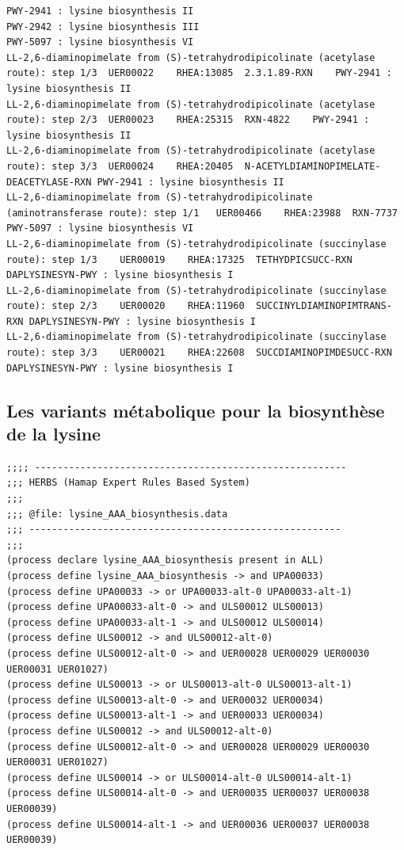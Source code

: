 \begin{adjustbox}{width=\textwidth}
\begin{lstlisting}[basicstyle=\tiny\normalfont\ttfamily,tabsize=2,showtabs=true,caption=DAP\_uer\_metacyc.tsv]
PWY-2941 : lysine biosynthesis II 
PWY-2942 : lysine biosynthesis III 
PWY-5097 : lysine biosynthesis VI 
LL-2,6-diaminopimelate from (S)-tetrahydrodipicolinate (acetylase route): step 1/3	UER00022	RHEA:13085	2.3.1.89-RXN	PWY-2941 : lysine biosynthesis II 
LL-2,6-diaminopimelate from (S)-tetrahydrodipicolinate (acetylase route): step 2/3	UER00023	RHEA:25315	RXN-4822	PWY-2941 : lysine biosynthesis II 
LL-2,6-diaminopimelate from (S)-tetrahydrodipicolinate (acetylase route): step 3/3	UER00024	RHEA:20405	N-ACETYLDIAMINOPIMELATE-DEACETYLASE-RXN	PWY-2941 : lysine biosynthesis II 
LL-2,6-diaminopimelate from (S)-tetrahydrodipicolinate (aminotransferase route): step 1/1	UER00466	RHEA:23988	RXN-7737	PWY-5097 : lysine biosynthesis VI 
LL-2,6-diaminopimelate from (S)-tetrahydrodipicolinate (succinylase route): step 1/3	UER00019	RHEA:17325	TETHYDPICSUCC-RXN	DAPLYSINESYN-PWY : lysine biosynthesis I 
LL-2,6-diaminopimelate from (S)-tetrahydrodipicolinate (succinylase route): step 2/3	UER00020	RHEA:11960	SUCCINYLDIAMINOPIMTRANS-RXN	DAPLYSINESYN-PWY : lysine biosynthesis I 
LL-2,6-diaminopimelate from (S)-tetrahydrodipicolinate (succinylase route): step 3/3	UER00021	RHEA:22608	SUCCDIAMINOPIMDESUCC-RXN	DAPLYSINESYN-PWY : lysine biosynthesis I 
\end{lstlisting}
\end{adjustbox}

\subsection{Les variants métabolique pour la biosynthèse de la lysine}
\begin{lstlisting}[basicstyle=\tiny\normalfont\ttfamily,caption=data/processes/lysine\_DAP\_biosynthesis.data]
;;;; -------------------------------------------------------
;;; HERBS (Hamap Expert Rules Based System)
;;;
;;; @file: lysine_AAA_biosynthesis.data
;;; -------------------------------------------------------
;;;
(process declare lysine_AAA_biosynthesis present in ALL)
(process define lysine_AAA_biosynthesis -> and UPA00033)
(process define UPA00033 -> or UPA00033-alt-0 UPA00033-alt-1)
(process define UPA00033-alt-0 -> and ULS00012 ULS00013)
(process define UPA00033-alt-1 -> and ULS00012 ULS00014)
(process define ULS00012 -> and ULS00012-alt-0)
(process define ULS00012-alt-0 -> and UER00028 UER00029 UER00030 UER00031 UER01027)
(process define ULS00013 -> or ULS00013-alt-0 ULS00013-alt-1)
(process define ULS00013-alt-0 -> and UER00032 UER00034)
(process define ULS00013-alt-1 -> and UER00033 UER00034)
(process define ULS00012 -> and ULS00012-alt-0)
(process define ULS00012-alt-0 -> and UER00028 UER00029 UER00030 UER00031 UER01027)
(process define ULS00014 -> or ULS00014-alt-0 ULS00014-alt-1)
(process define ULS00014-alt-0 -> and UER00035 UER00037 UER00038 UER00039)
(process define ULS00014-alt-1 -> and UER00036 UER00037 UER00038 UER00039)
\end{lstlisting}

